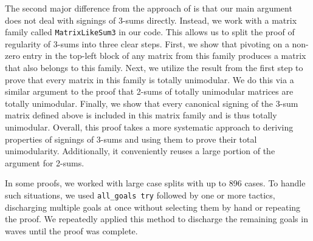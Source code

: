 The second major difference from the approach of \cite{Truemper2016} is that our main argument does not deal with signings of 3-sums directly. Instead, we work with a matrix family called \texttt{MatrixLikeSum3} in our code. This allows us to split the proof of regularity of 3-sums into three clear steps. First, we show that pivoting on a non-zero entry in the top-left block of any matrix from this family produces a matrix that also belongs to this family. Next, we utilize the result from the first step to prove that every matrix in this family is totally unimodular. We do this via a similar argument to the proof that 2-sums of totally unimodular matrices are totally unimodular. Finally, we show that every canonical signing of the 3-sum matrix defined above is included in this matrix family and is thus totally unimodular. Overall, this proof takes a more systematic approach to deriving properties of signings of 3-sums and using them to prove their total unimodularity. Additionally, it conveniently reuses a large portion of the argument for 2-sums.

In some proofs, we worked with large case splits with up to 896 cases. To handle such situations, we used \texttt{all\_goals try} followed by one or more tactics, discharging multiple goals at once without selecting them by hand or repeating the proof. We repeatedly applied this method to discharge the remaining goals in waves until the proof was complete.
